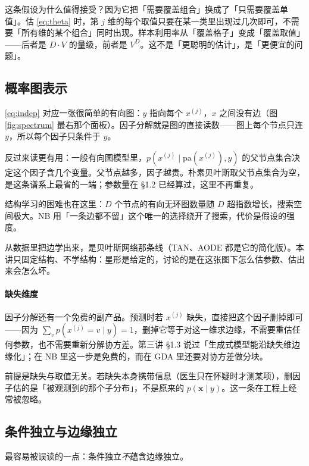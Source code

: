 \documentclass[11pt,a4paper,fontset=windows,zihao=-4]{ctexart}
\newcommand{\bx}{\mathbf{x}}
\begin{document}
这条假设为什么值得接受？因为它把「需要覆盖组合」换成了「只需要覆盖单值」。估 \eqref{eq:theta} 时，第 $j$ 维的每个取值只要在某一类里出现过几次即可，不需要「所有维的某个组合」同时出现。样本利用率从「覆盖格子」变成「覆盖取值」——后者是 $D\cdot V$ 的量级，前者是 $V^D$。这不是「更聪明的估计」，是「更便宜的问题」。

\subsection{概率图表示}

\eqref{eq:indep} 对应一张很简单的有向图：$y$ 指向每个 $x^{(j)}$，$x$ 之间没有边（图 \ref{fig:spectrum} 最右那个面板）。因子分解就是图的直接读数——图上每个节点只连 $y$，所以每个因子只条件于 $y$。

反过来读更有用：一般有向图模型里，$p(x^{(j)}\mid \mathrm{pa}(x^{(j)}),y)$ 的父节点集合决定这个因子含几个变量。父节点越多，因子越贵。朴素贝叶斯取父节点集合为空，是这条谱系上最省的一端；参数量在 §1.2 已经算过，这里不再重复。

结构学习的困难也在这里：$D$ 个节点的有向无环图数量随 $D$ 超指数增长，搜索空间极大。NB 用「一条边都不留」这个唯一的选择绕开了搜索，代价是假设的强度。

\begin{add}[结构学习]
从数据里把边学出来，是贝叶斯网络那条线（TAN、AODE 都是它的简化版）。本讲只固定结构、不学结构：星形是给定的，讨论的是在这张图下怎么估参数、估出来会怎么坏。
\end{add}

\paragraph{缺失维度} 因子分解还有一个免费的副产品。预测时若 $x^{(j)}$ 缺失，直接把这个因子删掉即可——因为 $\sum_v p(x^{(j)}=v\mid y)=1$，删掉它等于对这一维求边缘，不需要重估任何参数，也不需要重新分解协方差。第三讲 §1.3 说过「生成式模型能沿缺失维边缘化」；在 NB 里这一步是免费的，而在 GDA 里还要对协方差做分块。

前提是缺失与取值无关。若缺失本身携带信息（医生只在怀疑时才测某项），删因子估的是「被观测到的那个子分布」，不是原来的 $p(\bx\mid y)$。这一条在工程上经常被忽略。

\subsection{条件独立与边缘独立}

最容易被误读的一点：条件独立\emph{不}蕴含边缘独立。
\end{document}
